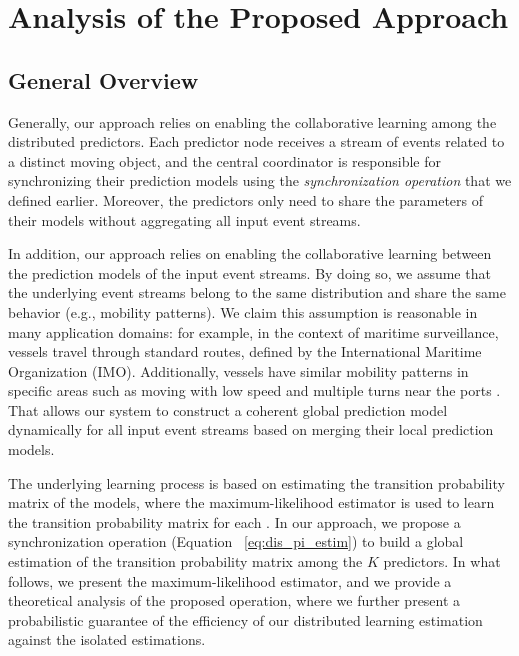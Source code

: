 \section{Analysis of the Proposed Approach}

\subsection{General  Overview}
\par Generally, our approach relies on enabling the collaborative learning among the distributed predictors. Each predictor node receives a stream of events related to a distinct moving object, and the central coordinator is responsible for synchronizing their prediction models using the \textit{synchronization operation} that we defined earlier. Moreover, the predictors only need to share the parameters of their models without aggregating all input event streams. 

\par In addition, our approach relies on enabling the collaborative learning between the prediction models of the input event streams. By doing so, we assume that the underlying event streams belong to the same  distribution and share the same behavior (e.g., mobility patterns). We claim this assumption is reasonable in many application domains: for example, in the context of maritime surveillance, vessels travel through standard routes, defined by the International Maritime Organization (IMO). Additionally, vessels have similar mobility patterns in specific areas such as moving with low speed and multiple turns near the ports \cite{pallotta2013vessel,liu2014knowledge}. That allows our system to construct a coherent global prediction model dynamically for all input event streams based on merging their local prediction models.

\par The underlying learning process is based on estimating the transition probability matrix of the \pmcmr models, where the maximum-likelihood estimator  \cite{anderson1957statistical} is used to learn the transition probability matrix for each \pmcmr. In our approach, we propose a synchronization operation (Equation ~\ref{eq:dis_pi_estim}) to build a global estimation of the transition probability matrix among the \emph{$K$} predictors. In what follows, we present the maximum-likelihood estimator, and we  provide a theoretical analysis of the proposed operation, where we further present a probabilistic guarantee of the efficiency of our distributed learning estimation against the isolated estimations.   


